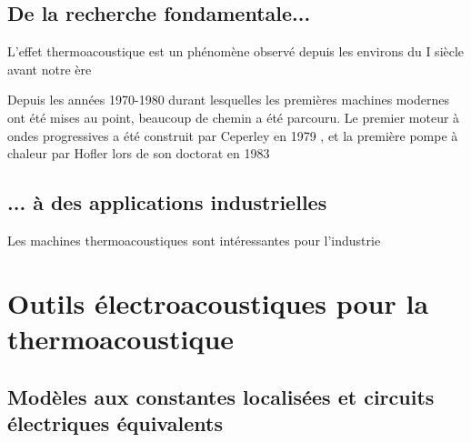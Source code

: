 \subsection{De la recherche fondamentale...}
L'effet thermoacoustique est un phénomène observé depuis les environs du I\ier{} siècle avant notre ère  \cite{adeff_measurement_1991}

Depuis les années 1970-1980 durant lesquelles les premières machines modernes ont été mises au point, beaucoup de chemin a été parcouru. Le premier moteur à ondes progressives a été construit par Ceperley en 1979 \cite{ceperley_pistonless_1979}, et la première pompe à chaleur par Hofler lors de son doctorat en 1983 

\subsection{... à des applications industrielles}
Les machines thermoacoustiques sont intéressantes pour l'industrie \cite{swift_thermoacoustics_2002, wollan_development_2002, adeff_measurement_1991, garrett_thermoacoustic_1993}

\section{Outils électroacoustiques pour la thermoacoustique}
%
%    

\subsection{Modèles aux constantes localisées et circuits électriques équivalents}

